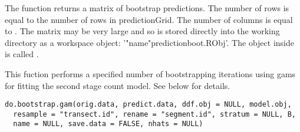 \documentclass[a4paper]{book}
\begin{document}
%
\begin{Value}
The function returns a matrix of bootstrap predictions. The number of rows is equal to the number of rows in predictionGrid.  The number of columns is equal to .  The matrix may be very large and so is stored directly into the working directory as a workspace object: '"name"predictionboot.RObj'.  The object inside is called .
\end{Value}
%
\begin{Description}\relax
This fuction performs a specified number of bootstrapping iterations using gams for fitting the 
second stage count model. See below for details.
\end{Description}
%
\begin{Usage}
\begin{verbatim}
do.bootstrap.gam(orig.data, predict.data, ddf.obj = NULL, model.obj,
  resample = "transect.id", rename = "segment.id", stratum = NULL, B,
  name = NULL, save.data = FALSE, nhats = NULL)
\end{verbatim}
\end{Usage}
%
\end{document}
